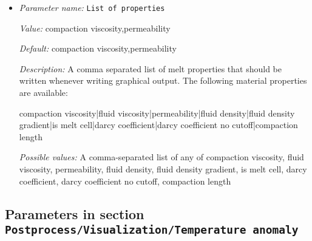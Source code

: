 \begin{itemize}
\item {\it Parameter name:} {\tt List of properties}
\label{parameters:Postprocess/Visualization/Melt material properties/List of properties}


{\it Value:} compaction viscosity,permeability


{\it Default:} compaction viscosity,permeability


{\it Description:} A comma separated list of melt properties that should be written whenever writing graphical output. The following material properties are available:

compaction viscosity|fluid viscosity|permeability|fluid density|fluid density gradient|is melt cell|darcy coefficient|darcy coefficient no cutoff|compaction length


{\it Possible values:} A comma-separated list of any of compaction viscosity, fluid viscosity, permeability, fluid density, fluid density gradient, is melt cell, darcy coefficient, darcy coefficient no cutoff, compaction length
\end{itemize}

\subsection{Parameters in section \tt Postprocess/Visualization/Temperature anomaly}
\label{parameters:Postprocess/Visualization/Temperature_20anomaly}

